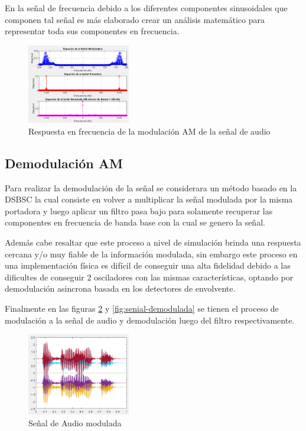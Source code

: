 \documentclass[conference]{IEEEtran}
\begin{document}
	En la señal de frecuencia debido a los diferentes componentes sinusoidales que componen tal señal es más elaborado crear un análisis matemático para representar toda sus componentes en frecuencia.
	
	\begin{figure}[h]
		\centering
		\includegraphics[width=0.4\textwidth]{media/modulacion-audio-frecuencia}
		\caption{Respuesta en frecuencia de la modulación AM de la señal de audio}
		\label{fig:modulacion-audio-frecuencia}
	\end{figure}
	
	
	
	\subsection{Demodulación  AM}
	Para realizar la demodulación de la señal se considerara un método basado en la DSBSC la cual consiste en volver a multiplicar la señal modulada por la misma portadora y luego aplicar un filtro pasa bajo para solamente recuperar las componentes en frecuencia de banda base con la cual se genero la señal.
	
	Además cabe resaltar que este proceso a nivel de simulación brinda una respuesta cercana y/o muy fiable de la información modulada, sin embargo este proceso en una implementación física es difícil de conseguir una alta fidelidad debido a las dificultes de conseguir 2 osciladores con las mismas características, optando por demodulación asincrona basada en los detectores de envolvente.
	
	Finalmente en las figuras \ref{fig:senial-modulada} y \ref{fig:senial-demodulada} se tienen el proceso de modulación a la señal de audio y demodulación luego del filtro respectivamente.
	
	\begin{figure}[h]
		\centering
		\includegraphics[width=0.4\textwidth]{media/senial-modulada}
		\caption{Señal de Audio modulada}
		\label{fig:senial-modulada}
	\end{figure}
	
\end{document}
